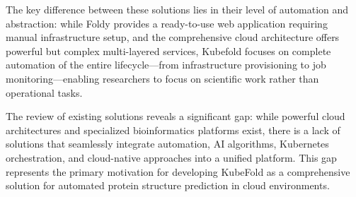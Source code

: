 The key difference between these solutions lies in their level of automation and abstraction: while Foldy provides a ready-to-use web application requiring manual infrastructure setup, and the comprehensive cloud architecture offers powerful but complex multi-layered services, Kubefold focuses on complete automation of the entire lifecycle—from infrastructure provisioning to job monitoring—enabling researchers to focus on scientific work rather than operational tasks.

The review of existing solutions reveals a significant gap: while powerful cloud architectures and specialized bioinformatics platforms exist, there is a lack of solutions that seamlessly integrate automation, AI algorithms, Kubernetes orchestration, and cloud-native approaches into a unified platform.
This gap represents the primary motivation for developing KubeFold as a comprehensive solution for automated protein structure prediction in cloud environments.
